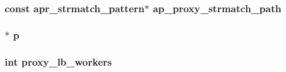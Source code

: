 \subsubsection[{\texorpdfstring{ap\+\_\+proxy\+\_\+strmatch\+\_\+path}{ap_proxy_strmatch_path}}]{ const {\bf apr\+\_\+strmatch\+\_\+pattern}$\ast$ ap\+\_\+proxy\+\_\+strmatch\+\_\+path}\hypertarget{group__MOD__PROXY__PRIVATE_ga18e4b565b0367b56f721343a9cb1b583}{}\label{group__MOD__PROXY__PRIVATE_ga18e4b565b0367b56f721343a9cb1b583}
\subsubsection[{\texorpdfstring{p}{p}}]{$\ast$ p}\hypertarget{group__MOD__PROXY__PRIVATE_ga2e727f881424334cf12d8af10f50ec6c}{}\label{group__MOD__PROXY__PRIVATE_ga2e727f881424334cf12d8af10f50ec6c}
\subsubsection[{\texorpdfstring{proxy\+\_\+lb\+\_\+workers}{proxy_lb_workers}}]{ {\bf int} proxy\+\_\+lb\+\_\+workers}\hypertarget{group__MOD__PROXY__PRIVATE_ga748653e1e5c4afc14fca2a4b57136259}{}\label{group__MOD__PROXY__PRIVATE_ga748653e1e5c4afc14fca2a4b57136259}
